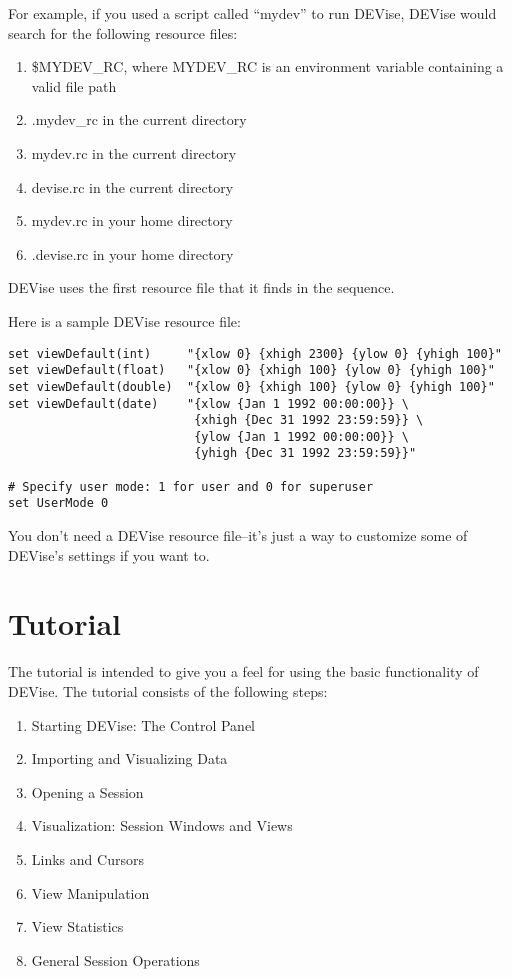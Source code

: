 For example, if you used a script called ``mydev'' to run DEVise, DEVise
would search for the following resource files:

\begin{enumerate}
	\item \$MYDEV\_RC, where MYDEV\_RC is an environment variable
		containing a valid file path
	\item .mydev\_rc in the current directory
	\item mydev.rc in the current directory
	\item devise.rc in the current directory
	\item mydev.rc in your home directory
	\item .devise.rc in your home directory
\end{enumerate}

DEVise uses the first resource file that it finds in the sequence.

Here is a sample DEVise resource file:

\begin{verbatim}
set viewDefault(int)     "{xlow 0} {xhigh 2300} {ylow 0} {yhigh 100}"
set viewDefault(float)   "{xlow 0} {xhigh 100} {ylow 0} {yhigh 100}"
set viewDefault(double)  "{xlow 0} {xhigh 100} {ylow 0} {yhigh 100}"
set viewDefault(date)    "{xlow {Jan 1 1992 00:00:00}} \
                          {xhigh {Dec 31 1992 23:59:59}} \
                          {ylow {Jan 1 1992 00:00:00}} \
                          {yhigh {Dec 31 1992 23:59:59}}"

# Specify user mode: 1 for user and 0 for superuser
set UserMode 0
\end{verbatim}

You don't need a DEVise resource file--it's just a way to customize some
of DEVise's settings if you want to.


\section{Tutorial}

The tutorial is intended to give you a feel for using the basic functionality of
DEVise. The tutorial consists of the following steps:

\begin{enumerate}
	\item Starting DEVise: The Control Panel
	\item Importing and Visualizing Data
	\item Opening a Session
	\item Visualization: Session Windows and Views
	\item Links and Cursors
	\item View Manipulation
	\item View Statistics
	\item General Session Operations
\end{enumerate}

